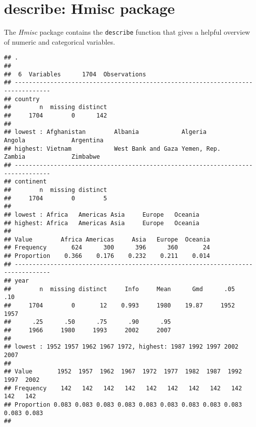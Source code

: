 \documentclass[]{book}
\newenvironment{Shaded}{\begin{snugshade}}{\end{snugshade}}
\newcommand{\KeywordTok}[1]{\textcolor[rgb]{0.13,0.29,0.53}{\textbf{#1}}}
\newcommand{\StringTok}[1]{\textcolor[rgb]{0.31,0.60,0.02}{#1}}
\newcommand{\OperatorTok}[1]{\textcolor[rgb]{0.81,0.36,0.00}{\textbf{#1}}}
\newcommand{\NormalTok}[1]{#1}
\begin{document}
\section{describe: Hmisc package}\label{describe-hmisc-package}

The \emph{Hmisc} package contains the \texttt{describe} function that
gives a helpful overview of numeric and categorical variables.

\begin{Shaded}
\end{Shaded}

\begin{verbatim}
## . 
## 
##  6  Variables      1704  Observations
## --------------------------------------------------------------------------------
## country 
##        n  missing distinct 
##     1704        0      142 
## 
## lowest : Afghanistan        Albania            Algeria            Angola             Argentina         
## highest: Vietnam            West Bank and Gaza Yemen, Rep.        Zambia             Zimbabwe          
## --------------------------------------------------------------------------------
## continent 
##        n  missing distinct 
##     1704        0        5 
## 
## lowest : Africa   Americas Asia     Europe   Oceania 
## highest: Africa   Americas Asia     Europe   Oceania 
##                                                        
## Value        Africa Americas     Asia   Europe  Oceania
## Frequency       624      300      396      360       24
## Proportion    0.366    0.176    0.232    0.211    0.014
## --------------------------------------------------------------------------------
## year 
##        n  missing distinct     Info     Mean      Gmd      .05      .10 
##     1704        0       12    0.993     1980    19.87     1952     1957 
##      .25      .50      .75      .90      .95 
##     1966     1980     1993     2002     2007 
## 
## lowest : 1952 1957 1962 1967 1972, highest: 1987 1992 1997 2002 2007
##                                                                             
## Value       1952  1957  1962  1967  1972  1977  1982  1987  1992  1997  2002
## Frequency    142   142   142   142   142   142   142   142   142   142   142
## Proportion 0.083 0.083 0.083 0.083 0.083 0.083 0.083 0.083 0.083 0.083 0.083
##                 

\end{verbatim}
\end{document}
